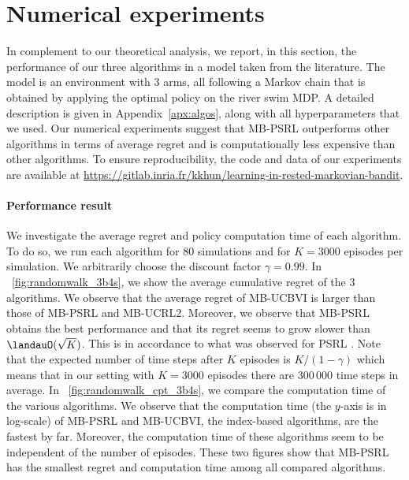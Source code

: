 \section{Numerical experiments}
\label{ch:rested:sec:numerical}

In complement to our theoretical analysis, we report, in this section, the performance of our three algorithms in a model taken from the literature. %
The model is an environment with 3 arms, all following a Markov chain that is obtained by applying the optimal policy on the river swim MDP. A detailed description is given in Appendix~\ref{apx:algos}, along with all hyperparameters that we used. Our numerical experiments suggest that MB-PSRL outperforms other algorithms in terms of average regret and is computationally less expensive than other algorithms. To ensure reproducibility, the code and data of our experiments are available at \url{https://gitlab.inria.fr/kkhun/learning-in-rested-markovian-bandit}.

\paragraph{Performance result}
We investigate the average regret and policy computation time of each algorithm.
To do so, we run each algorithm for $80$ simulations and for $K=3000$ episodes per simulation. We arbitrarily choose the discount factor $\gamma=0.99$. In \figurename~\ref{fig:randomwalk_3b4s}, we show the average cumulative regret of the 3 algorithms. We observe that the average regret of MB-UCBVI is larger than those of MB-PSRL and MB-UCRL2.
Moreover, we observe that MB-PSRL obtains the best performance and that its regret seems to grow slower than $\landauO(\sqrt{K})$. This is in accordance to what was observed for PSRL \cite{osband2013more}. 
Note that the expected number of time steps after $K$ episodes is $K/(1-\gamma)$ which means that in our setting with $K=3000$ episodes there are $300\,000$ time steps in average. 
In \figurename~\ref{fig:randomwalk_cpt_3b4s}, we compare the computation time of the various algorithms. We observe that the computation time (the $y$-axis is in log-scale) of MB-PSRL and MB-UCBVI, the index-based algorithms, are the fastest by far. 
Moreover, the computation time of these algorithms seem to be independent of the number of episodes. 
These two figures show that MB-PSRL has the smallest regret and computation time among all compared algorithms.

